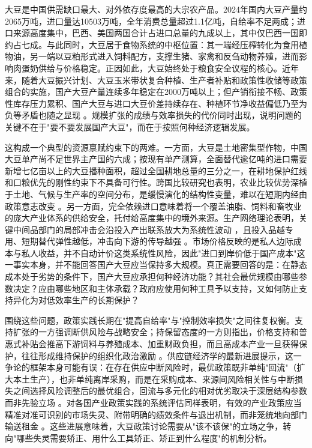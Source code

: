\documentclass[UTF8,zihao=-4,fontset=fandol]{ctexart}
\numberwithin{equation}{section}
\theoremstyle{definition}
\theoremstyle{remark}
\begin{document}
大豆是中国供需缺口最大、对外依存度最高的大宗农产品。2024年国内大豆产量约2065万吨，进口量达10503万吨，全年消费总量超过1.1亿吨，自给率不足两成；进口来源高度集中，巴西、美国两国合计占进口总量的九成以上，其中仅巴西一国即约占七成。与此同时，大豆居于食物系统的中枢位置：其一端经压榨转化为食用植物油，另一端以豆粕形式进入饲料配方，支撑生猪、家禽和反刍动物养殖，进而影响肉蛋奶供给与价格稳定。正因如此，大豆始终处于粮食安全议程的核心。近年来，随着大豆振兴计划、大豆玉米带状复合种植、生产者补贴和政策性收储等政策组合的实施，国产大豆产量连续多年稳定在2000万吨以上；但产销衔接不畅、政策性库存压力累积、国产大豆与进口大豆价差持续存在、种植环节净收益偏低乃至为负等矛盾也随之显现 \parencite{CAASSoy2026}。规模扩张的成绩与效率损失的代价同时出现，说明问题的关键不在于"要不要发展国产大豆"，而在于按照何种经济逻辑发展。

这构成一个典型的资源禀赋约束下的两难。一方面，大豆是土地密集型作物，中国大豆单产尚不足世界主产国的六成；按现有单产测算，全面替代逾亿吨的进口需要新增七亿亩以上的大豆播种面积，超过全国耕地总量的三分之一，在耕地保护红线和口粮优先的刚性约束下不具备可行性。跨国比较研究也表明，农业比较优势深植于土地、气候与生产率的空间分布，是缓慢演化的结构性变量，难以在短期内经由政策意志改变 \parencite{CostinotDonaldsonSmith2016}。另一方面，完全依赖进口意味着将一个覆盖油脂、饲料和畜牧业的庞大产业体系的供给安全，托付给高度集中的境外来源。生产网络理论表明，关键中间品部门的局部冲击会沿投入产出联系放大为系统性波动 \parencite{AcemogluEtAl2012}，且投入品越专用、短期替代弹性越低，冲击向下游的传导越强 \parencite{BarrotSauvagnat2016}。市场价格反映的是私人边际成本与私人收益，并不自动计价这类系统性风险，因此"进口到岸价低于国产成本"这一事实本身，并不能回答国产大豆应当保持多大规模。真正需要回答的是：在静态成本处于劣势的条件下，国产大豆应承担何种经济功能？其社会最优规模由哪些参数决定？应由哪些地区和主体承载？政府应使用何种工具予以支持，又如何防止支持异化为对低效率生产的长期保护？

围绕这些问题，政策实践长期在"提高自给率"与"控制效率损失"之间往复权衡。支持扩张的一方强调断供风险与战略安全；持保留态度的一方则指出，价格支持和普惠式补贴会推高下游饲料与养殖成本、加重财政负担，而且高成本产业一旦获得保护，往往形成维持保护的组织化政治激励 \parencite{GrossmanHelpman1994}。供应链经济学的最新进展提示，这一争论的框架本身可能有误：在存在供应中断风险时，最优政策既非单纯"回流"（扩大本土生产），也非单纯离岸采购，而是在采购成本、来源间风险相关性与中断损失之间选择风险调整后的最优组合，回流与多元化的相对优劣取决于深层结构参数而非先验立场 \parencite{GrossmanHelpmanLhuillier2023}。对各国产业政策实践的系统评估同样表明，有效的产业政策应当精准对准可识别的市场失灵、附带明确的绩效条件与退出机制，而非笼统地向部门输送租金 \parencite{JuhaszLaneRodrik2024}。这些进展意味着，大豆政策讨论需要从"该不该保"的立场之争，转向"哪些失灵需要矫正、用什么工具矫正、矫正到什么程度"的机制分析。
\end{document}
